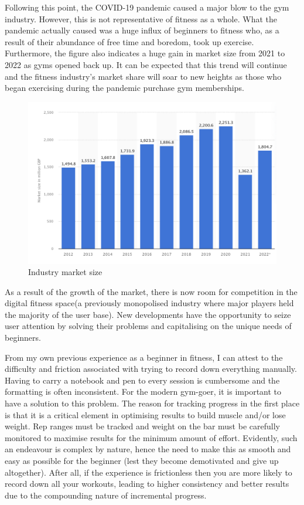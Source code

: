 \documentclass{article}
\begin{document}
Following this point, the COVID-19 pandemic caused a major blow to the gym industry. However, this is not representative of fitness as a whole. What the pandemic actually caused was a huge influx of beginners to fitness who, as a result of their abundance of free time and boredom, took up exercise. Furthermore, the figure also indicates a huge gain in market size from 2021 to 2022 as gyms opened back up. It can be expected that this trend will continue and the fitness industry’s market share will soar to new heights as those who began exercising during the pandemic purchase gym memberships.
\begin{figure}[ht]
  \raggedright
  \includegraphics[width=1\textwidth]{img/Figure 1.png}
  \caption{Industry market size}
  \label{fig:Figure 1}
\end{figure}

As a result of the growth of the market, there is now room for competition in the digital fitness space(a previously monopolised industry where major players held the majority of the user base). New developments have the opportunity to seize user attention by solving their problems and capitalising on the unique needs of beginners.

From my own previous experience as a beginner in fitness, I can attest to the difficulty and friction associated with trying to record down everything manually. Having to carry a notebook and pen to every session is cumbersome and the formatting is often inconsistent. For the modern gym-goer, it is important to have a solution to this problem. The reason for tracking progress in the first place is that it is a critical element in optimising results to build muscle and/or lose weight. Rep ranges must be tracked and weight on the bar must be carefully monitored to maximise results for the minimum amount of effort. Evidently, such an endeavour is complex by nature, hence the need to make this as smooth and easy as possible for the beginner (lest they become demotivated and give up altogether). After all, if the experience is frictionless then you are more likely to record down all your workouts, leading to higher consistency and better results due to the compounding nature of incremental progress. 
\end{document}
